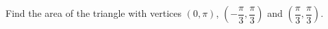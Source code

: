 Find the area of the triangle with vertices $(0,\pi)$, $\left(-\dfrac{\pi}{3},\dfrac{\pi}{3}\right)$ and $\left(\dfrac{\pi}{3},\dfrac{\pi}{3}\right)$.
